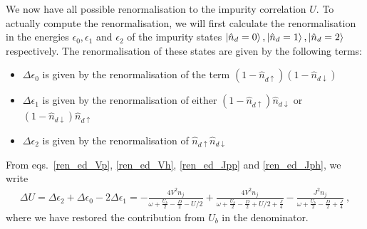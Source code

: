 \documentclass[reprint,superscriptaddress,floatfix]{revtex4-2}
\begin{document}
\begin{widetext}
We now have all possible renormalisation to the impurity correlation \(U\). To actually compute the renormalisation, we will first calculate the renormalisation in the energies \(\epsilon_0, \epsilon_1\) and \(\epsilon_2\) of the impurity states \(\ket{\hat n_d = 0}, \ket{\hat n_d = 1}, \ket{\hat n_d = 2}\) respectively. The renormalisation of these states are given by the following terms:
\begin{itemize}
	\item \(\Delta \epsilon_0\) is given by the renormalisation of the term \(\left(1 - \hat n_{d\uparrow}\right)\left(1 - \hat n_{d \downarrow}\right)\)
	\item \(\Delta \epsilon_1\) is given by the renormalisation of either \(\left(1 - \hat n_{d\uparrow}\right)\hat n_{d \downarrow}\) or \(\left(1 - \hat n_{d\downarrow}\right)\hat n_{d \uparrow}\)
	\item \(\Delta \epsilon_2\) is given by the renormalisation of \(\hat n_{d\uparrow}\hat n_{d \downarrow}\)
\end{itemize}
From eqs.~\ref{ren_ed_Vp}, \ref{ren_ed_Vh}, \ref{ren_ed_Jpp} and \ref{ren_ed_Jph}, we write
\begin{equation}\begin{aligned}
	\Delta U = \Delta \epsilon_2 + \Delta \epsilon_0 - 2\Delta \epsilon_1 = -\frac{4V^2 n_j}{\omega + \frac{U_b}{2} - \frac{D}{2} - U/2} + \frac{4V^2 n_j}{\omega + \frac{U_b}{2} - \frac{D}{2} + U/2 + \frac{J}{4}} - \frac{J^2n_j}{\omega + \frac{U_b}{2} - \frac{D}{2} + \frac{J}{4}}~,
\end{aligned}\end{equation}
where we have restored the contribution from \(U_b\) in the denominator.


\end{widetext}
\end{document}
